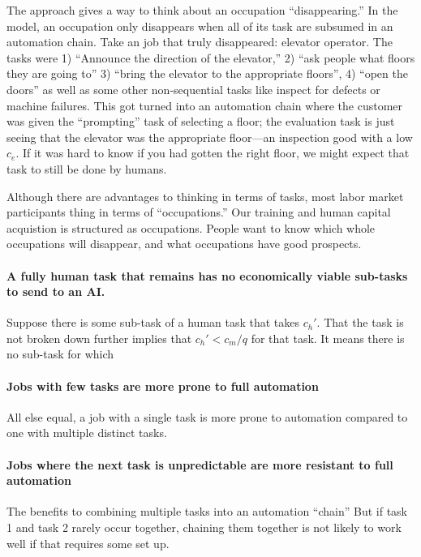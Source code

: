 \documentclass{article}
\begin{document}
The approach gives a way to think about an occupation ``disappearing.''
In the model, an occupation only disappears when all of its task are subsumed in an automation chain.
Take an job that truly disappeared: elevator operator. 
The tasks were 1) ``Announce the direction of the elevator,'' 2) ``ask people what floors they are going to'' 3) ``bring the elevator to the appropriate floors'', 4) ``open the doors'' as well as some other non-sequential tasks like inspect for defects or machine failures.  
This got turned into an automation chain where the customer was given the ``prompting'' task of selecting a floor; the evaluation task is just seeing that the elevator was the appropriate floor---an inspection good with a low $c_e$.
If it was hard to know if you had gotten the right floor, we might expect that task to still be done by humans.

Although there are advantages to thinking in terms of tasks, most labor market participants thing in terms of ``occupations.'' 
Our training and human capital acquistion is structured as occupations.
People want to know which whole occupations will disappear, and what occupations have good prospects. 

\paragraph{A fully human task that remains has no economically viable sub-tasks to send to an AI.}

Suppose there is some sub-task of a human task that takes $c_h'$.
That the task is not broken down further implies that $c_h' < c_m / q$ for that task. 
It means there is no sub-task for which 


\paragraph{Jobs with few tasks are more prone to full automation}
All else equal, a job with a single task is more prone to automation compared to one with multiple distinct tasks.

\paragraph{Jobs where the next task is unpredictable are more resistant to full automation}
The benefits to combining multiple tasks into an automation ``chain''
But if task 1 and task 2 rarely occur together, chaining them together is not likely to work well if that requires some set up.
\end{document}
